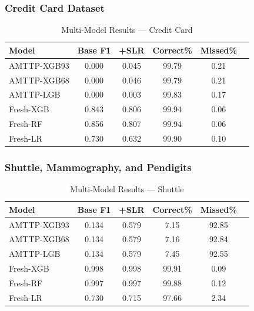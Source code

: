 \documentclass[journal]{IEEEtran}
\begin{document}
\subsubsection{Credit Card Dataset}

\begin{table}[!t]
\centering
\caption{Multi-Model Results --- Credit Card}
\label{tab:multi_credit}
\setlength{\tabcolsep}{3pt}
\begin{tabular}{@{}lccccc@{}}
\toprule
\textbf{Model} & \textbf{Base F1} & \textbf{+SLR} & \textbf{Correct\%} & \textbf{Missed\%} \\
\midrule
AMTTP-XGB93  & 0.000 & 0.045 & 99.79 & 0.21 \\
AMTTP-XGB68  & 0.000 & 0.046 & 99.79 & 0.21 \\
AMTTP-LGB    & 0.000 & 0.003 & 99.83 & 0.17 \\
Fresh-XGB    & 0.843 & 0.806 & 99.94 & 0.06 \\
Fresh-RF     & 0.856 & 0.807 & 99.94 & 0.06 \\
Fresh-LR     & 0.730 & 0.632 & 99.90 & 0.10 \\
\bottomrule
\end{tabular}
\end{table}

\subsubsection{Shuttle, Mammography, and Pendigits}

\begin{table}[!t]
\centering
\caption{Multi-Model Results --- Shuttle}
\label{tab:multi_shuttle}
\setlength{\tabcolsep}{3pt}
\begin{tabular}{@{}lccccc@{}}
\toprule
\textbf{Model} & \textbf{Base F1} & \textbf{+SLR} & \textbf{Correct\%} & \textbf{Missed\%} \\
\midrule
AMTTP-XGB93 & 0.134 & 0.579 & 7.15  & 92.85 \\
AMTTP-XGB68 & 0.134 & 0.579 & 7.16  & 92.84 \\
AMTTP-LGB   & 0.134 & 0.579 & 7.45  & 92.55 \\
Fresh-XGB   & 0.998 & 0.998 & 99.91 & 0.09 \\
Fresh-RF    & 0.997 & 0.997 & 99.88 & 0.12 \\
Fresh-LR    & 0.730 & 0.715 & 97.66 & 2.34 \\
\bottomrule
\end{tabular}
\end{table}
\end{document}
